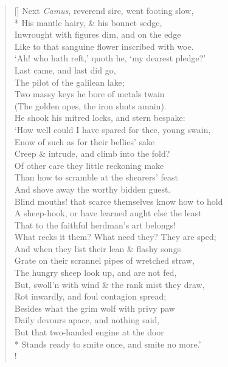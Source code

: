 \documentclass[MAIN]{subfiles}
\begin{document}
\begin{verse}[\versewidth]
Next \emph{Camus}, reverend sire, went footing slow,\\*
His mantle hairy, \& his bonnet sedge,\\
Inwrought with figures dim, and on the edge\\
Like to that sanguine flower inscribed with woe.\\
`Ah! who hath reft,' quoth he, `my dearest pledge?'\\
Last came, and last did go,\\
The pilot of the galilean lake;\\
Two massy keys he bore of metals twain\\
(The golden opes, the iron shuts amain).\\
He shook his mitred locks, and stern bespake:\\
`How well could I have spared for thee, young swain,\\
Enow of such as for their bellies' sake\\
Creep \& intrude, and climb into the fold?\\
Of other care they little reckoning make\\
Than how to scramble at the shearers' feast\\
And shove away the worthy bidden guest.\\
Blind mouths! that scarce themselves know how to hold\\
A sheep-hook, or have learned aught else the least\\
That to the faithful herdman's art belongs!\\
What recks it them? What need they? They are sped;\\
And when they list their lean \& flashy songs\\
Grate on their scrannel pipes of wretched straw,\\
The hungry sheep look up, and are not fed,\\
But, swoll'n with wind \& the rank mist they draw,\\
Rot inwardly, and foul contagion spread;\\
Besides what the grim wolf with privy paw\\
Daily devours apace, and nothing said,\\
But that two-handed engine at the door\\*
Stands ready to smite once, and smite no more.'\\!


\end{verse}
\end{document}
